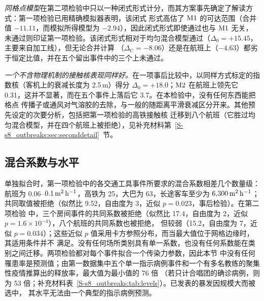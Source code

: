 \emph{同格点模型}在第二项检验中只以一种闭式形式计分，而其方案事先确定了解读方式：第一项检验已用精确模拟器表明，该闭式
形式高估了 $\mathrm{M1}$ 的可达范围（合并值 $-11.11$，而模拟所得模型为 $-2.94$），因此闭式形式即使通过也与 $\mathrm{M1}$ 无关，
未通过则印证第一项检验。该闭式形式相对于均匀混合模型通过（$\Delta_0=+15.45$，主要来自加工线），但无论合并计算
（$\Delta_{\mathrm{C}}=-8.06$）还是在航班上（$-4.63$）都劣于恒定比值，并在五个留出事件中的三个上未通过。

\emph{一个不含物理机制的接触核表现同样好。}在一项事后比较中，以同样方式标定的指数核（客机上的衰减长度为 2.5\,m）得分
$\Delta_0=+18.0$；$\mathrm{M2}$ 在航班上领先它 0.31，这并不显著，而在五个事件上落后它 3.7。在本检验中，没有任何东西能把格点
传播子或通风对气溶胶的去除，与一般的随距离平滑衰减区分开来。其他预先设定的次要分析，包括把第一项检验的高铁接触核
迁移到八个航班（它胜过均匀混合模型，并在四个航班上被拒绝），见补充材料第~\ref{S-s8_outbreaks:sec:seconddetail}~节。

\subsection{混合系数与水平}\label{s8_outbreaks:sec:mixing}\label{s8_outbreaks:sec:levels}

单独拟合时，第一项检验中的各交通工具事件所要求的混合系数相差几个数量级：航班为 0.06--$0.1\,\mathrm{m}^2\,\mathrm{h}^{-1}$，高铁为 25，大巴为
63，长途客车至少为 $6{,}300\,\mathrm{m}^2\,\mathrm{h}^{-1}$；共同取值被拒绝（似然比 9.52，自由度为 3，近似 $p=0.023$，事后检验）。在第二项检验
中，三个房间事件的共同系数被拒绝（似然比 17.4，自由度为 2，近似 $p=1.6\times10^{-4}$），八个航班的共同系数也被拒绝，
但较弱（15.2，自由度为 7，近似 $p=0.034$）；这些近似 $p$ 值采用卡方参照分布，而当最大值位于网格边缘时，其适用条件并不
满足。没有任何场所类别具有单一系数，也没有任何系数能在类别之间迁移。两项检验都对每个事件拟合一个传染力参数，因此本节
中没有任何罹患率是预测值；由第一数据集中五个单一指示病例事件和一个有多名教练的聚集性疫情推算出的释放率，最大值为最小值的 76 倍
（若只计合唱团的确诊病例，则为 53 倍；补充材料表~\ref{S-s8_outbreaks:tab:levels}）。已发表的暴发因规模大而被选中，
其水平无法由一个典型的指示病例预测。

